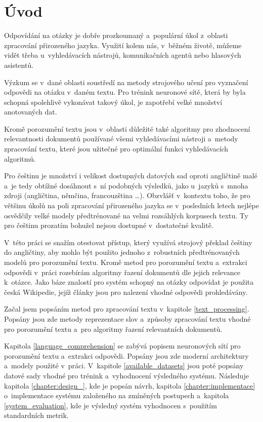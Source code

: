
\chapter{Úvod}
Odpovídání na otázky je dobře prozkoumaný a~populární úkol z~oblasti zpracování přirozeného jazyka. Využití kolem nás, v~běžném životě, můžeme vidět třeba u~vyhledávacích nástrojů, komunikačních agentů nebo hlasových asistentů.\par 
Výzkum se v~dané oblasti soustředí na metody strojového učení pro vyznačení odpovědi na otázku v~daném textu. Pro trénink neuronové sítě, která by byla schopná spolehlivě vykonávat takový úkol, je zapotřebí velké množství anotovaných dat.\par 
Kromě porozumění textu jsou v~oblasti důležité také algoritmy pro zhodnocení relevantnosti dokumentů používané všemi vyhledávacími nástroji a~metody zpracování textu, které jsou užitečné pro optimální funkci vyhledávacích algoritmů.\par
Pro češtinu je množství i velikost dostupných datových sad oproti angličtině malé a~je tedy obtížné dosáhnout s~ní podobných výsledků, jako u~jazyků s~mnoha zdroji (angličtina, němčina, francouzština \dots). Obzvlášť v~kontextu toho, že pro většinu úkolů na poli zpracování přirozeného jazyka se v~posledních letech nejlépe osvědčily velké modely předtrénované na velmi rozsáhlých korpusech textu. Ty pro češtinu prozatím bohužel nejsou dostupné v~dostatečné kvalitě.\par
V~této práci se snažím otestovat přístup, který využívá strojový překlad češtiny do angličtiny, aby mohlo být použito jednoho z~robustních předtrénovaných modelů pro porozumění textu. Kromě metod pro porozumění textu a~extrakci odpovědi v~práci rozebírám algoritmy řazení dokumentů dle jejich relevance k~otázce. Jako báze znalostí pro systém schopný na otázky odpovídat je použita česká Wikipedie, jejíž články jsou pro nalezení vhodné odpovědi prohledávány.\par
Začal jsem popsáním metod pro zpracování textu v~kapitole \ref{text_processing}. Popsány jsou zde metody reprezentace slov a~způsoby zpracování textu vhodné pro porozumění textu a~pro algoritmy řazení relevantních dokumentů.\par
Kapitola \ref{language_comprehension} se zabývá popisem neuronových sítí pro porozumění textu a~extrakci odpovědi. Popsány jsou zde moderní architektury a~modely použité v~práci. V~kapitole \ref{available_datasets} jsou poté popsány datové sady vhodné pro trénink a~vyhodnocení výsledného systému.
Následuje kapitola \ref{chapter:design_}, kde je popsán návrh, kapitola \ref{chapter:implementace} o~implementace systému založeného na zmíněných postupech a~kapitola \ref{system_evaluation}, kde je výsledný systém vyhodnocen s~použitím standardních metrik.

